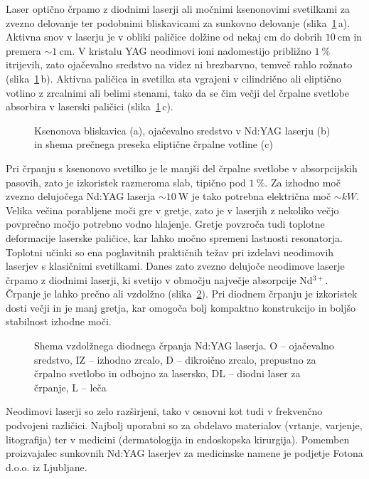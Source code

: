 Laser optično črpamo z diodnimi laserji ali močnimi ksenonovimi svetilkami za zvezno delovanje 
ter podobnimi bliskavicami za sunkovno delovanje (slika~\ref{fig:Nd}\,a). 
Aktivna snov v laserju je v obliki paličice dolžine od nekaj cm do dobrih 
$10~\si{\centi\metre}$ in premera $\sim 1~\si{\centi\metre}$. 
V kristalu YAG neodimovi ioni nadomestijo približno $1~\%$ itrijevih, zato ojačevalno
sredstvo na videz ni brezbarvno, temveč rahlo rožnato (slika~\ref{fig:Nd}\,b). 
Aktivna paličica in svetilka sta vgrajeni v cilindrično ali eliptično votlino z 
zrcalnimi ali belimi stenami, tako da se čim večji del črpalne svetlobe absorbira v 
laserski paličici (slika~\ref{fig:Nd}\,c).

\begin{figure}[h]
\centering
\def\svgwidth{120truemm} 

\caption{Ksenonova bliskavica (a), ojačevalno sredstvo v Nd:YAG laserju (b) 
in shema prečnega preseka eliptične črpalne votline (c)}
\label{fig:Nd}
\end{figure}

Pri črpanju s ksenonovo svetilko je le manjši del črpalne svetlobe v
absorpcijskih pasovih, zato je izkoristek razmeroma slab, tipično 
pod $1~\%$. Za izhodno moč zvezno delujočega Nd:YAG laserja $\sim 10~\si{\watt}$ je tako
potrebna električna moč $\sim \si{kW}$. Velika večina porabljene moči 
gre v gretje, zato je v laserjih z nekoliko večjo povprečno
močjo potrebno vodno hlajenje. Gretje povzroča tudi toplotne deformacije
laserske paličice, kar lahko močno spremeni lastnosti resonatorja. Toplotni
učinki so ena poglavitnih praktičnih težav pri izdelavi neodimovih
laserjev s klasičnimi svetilkami. Danes zato zvezno delujoče neodimove laserje
črpamo z diodnimi laserji, ki svetijo v območju največje
absorpcije Nd$^{3+}$. Črpanje je lahko prečno ali vzdolžno (slika~\ref{fig:NdS}). 
Pri diodnem črpanju je izkoristek dosti večji in je manj gretja, kar omogoča 
bolj kompaktno konstrukcijo in boljšo stabilnost izhodne moči.
\begin{figure}[h]
\centering
\def\svgwidth{120truemm} 

\caption{Shema vzdolžnega diodnega črpanja Nd:YAG laserja. O -- ojačevalno sredstvo, 
IZ -- izhodno zrcalo, D -- dikroično zrcalo, 
prepustno za črpalno svetlobo in odbojno za lasersko, DL -- diodni 
laser za črpanje, L -- leča
}
\label{fig:NdS}
\end{figure}

Neodimovi laserji so zelo razširjeni, tako v osnovni kot tudi v frekvenčno 
podvojeni različici. Najbolj uporabni so za obdelavo materialov (vrtanje, varjenje, 
litografija) ter v medicini (dermatologija in endoskopska kirurgija). 
Pomemben proizvajalec sunkovnih Nd:YAG laserjev 
za medicinske namene je podjetje Fotona d.o.o. iz Ljubljane.

